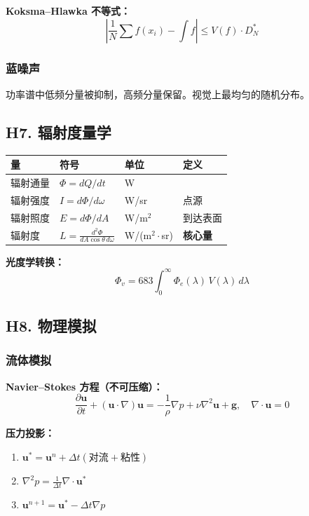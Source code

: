 \textbf{Koksma--Hlawka 不等式：}
\[
\left|\frac{1}{N}\sum f(x_i) - \int f\right| \leq V(f) \cdot D_N^*
\]

\subsubsection{蓝噪声}

功率谱中低频分量被抑制，高频分量保留。视觉上最均匀的随机分布。

\subsection{H7. 辐射度量学}

\begin{center}
\begin{tabular}{llll}
\toprule
\textbf{量} & \textbf{符号} & \textbf{单位} & \textbf{定义} \\
\midrule
辐射通量 & $\Phi = dQ/dt$ & W & \\
辐射强度 & $I = d\Phi/d\omega$ & W/sr & 点源 \\
辐射照度 & $E = d\Phi/dA$ & W/m$^2$ & 到达表面 \\
辐射度 & $L = \frac{d^2\Phi}{dA\cos\theta\,d\omega}$ & W/(m$^2\cdot$sr) & \textbf{核心量} \\
\bottomrule
\end{tabular}
\end{center}

\textbf{光度学转换：}
\[
\Phi_v = 683 \int_0^\infty \Phi_e(\lambda)\, V(\lambda)\, d\lambda
\]

\subsection{H8. 物理模拟}

\subsubsection{流体模拟}

\textbf{Navier--Stokes 方程（不可压缩）：}
\[
\frac{\partial \mathbf{u}}{\partial t} + (\mathbf{u}\cdot\nabla)\mathbf{u} = -\frac{1}{\rho}\nabla p + \nu\nabla^2\mathbf{u} + \mathbf{g}, \quad \nabla \cdot \mathbf{u} = 0
\]

\textbf{压力投影：}
\begin{enumerate}
  \item $\mathbf{u}^* = \mathbf{u}^n + \Delta t(\text{对流} + \text{粘性})$
  \item $\nabla^2 p = \frac{1}{\Delta t}\nabla\cdot\mathbf{u}^*$
  \item $\mathbf{u}^{n+1} = \mathbf{u}^* - \Delta t\nabla p$
\end{enumerate}

